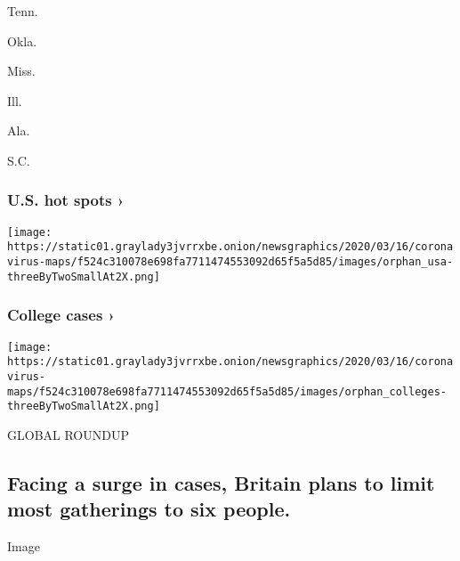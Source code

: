 Tenn.
\href{https://www.nytimes3xbfgragh.onion/interactive/2020/us/oklahoma-coronavirus-cases.html}{}

Okla.
\href{https://www.nytimes3xbfgragh.onion/interactive/2020/us/mississippi-coronavirus-cases.html}{}

Miss.
\href{https://www.nytimes3xbfgragh.onion/interactive/2020/us/illinois-coronavirus-cases.html}{}

Ill.
\href{https://www.nytimes3xbfgragh.onion/interactive/2020/us/alabama-coronavirus-cases.html}{}

Ala.
\href{https://www.nytimes3xbfgragh.onion/interactive/2020/us/south-carolina-coronavirus-cases.html}{}

S.C.

\href{https://www.nytimes3xbfgragh.onion/interactive/2020/us/coronavirus-us-cases.html}{}

\hypertarget{us-hot-spots-}{%
\subsubsection{U.S. hot spots ›}\label{us-hot-spots-}}

\texttt{[image: https://static01.graylady3jvrrxbe.onion/newsgraphics/2020/03/16/coronavirus-maps/f524c310078e698fa7711474553092d65f5a5d85/images/orphan\_usa-threeByTwoSmallAt2X.png]}
\href{https://www.nytimes3xbfgragh.onion/interactive/2020/07/28/us/covid-19-colleges-universities.html}{}

\hypertarget{college-cases-}{%
\subsubsection{College cases ›}\label{college-cases-}}

\texttt{[image: https://static01.graylady3jvrrxbe.onion/newsgraphics/2020/03/16/coronavirus-maps/f524c310078e698fa7711474553092d65f5a5d85/images/orphan\_colleges-threeByTwoSmallAt2X.png]}

GLOBAL ROUNDUP

\hypertarget{facing-a-surge-in-cases-britain-plans-to-limit-most-gatherings-to-six-people}{%
\subsection{Facing a surge in cases, Britain plans to limit most
gatherings to six
people.}\label{facing-a-surge-in-cases-britain-plans-to-limit-most-gatherings-to-six-people}}

Image

